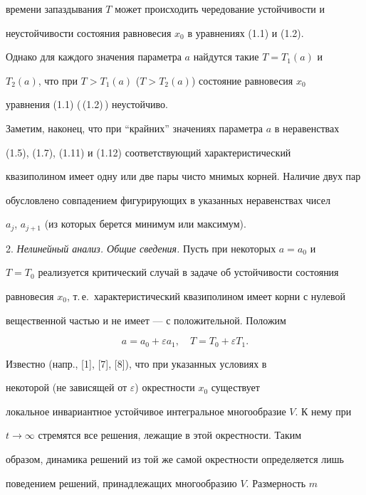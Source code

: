 времени запаздывания $T$ может происходить чередование устойчивости и


неустойчивости состояния равновесия $x_0$ в уравнениях (1.1) и (1.2).


Однако для каждого значения параметра $a$ найдутся такие $T=T_1(a)$ и


$T_2(a)$, что при $T>T_1(a)$ ($T>T_2(a)$) состояние равновесия $x_0$


уравнения (1.1) (\,(1.2)\,) неустойчиво.





Заметим, наконец, что при ``крайних'' значениях параметра $a$ в неравенствах


(1.5), (1.7), (1.11) и (1.12) соответствующий характеристический


квазиполином имеет одну или две пары чисто мнимых корней. Наличие двух пар


обусловлено совпадением фигурирующих в указанных неравенствах чисел


$a_j$, $a_{j+1}$ (из которых берется минимум или максимум).


\medskip





2. {\it Нелинейный анализ. Общие сведения.} Пусть при некоторых $a = a_0$ и


$T=T_0$ реализуется критический случай в задаче об устойчивости состояния


равновесия $x_0$, т.\,е.~характеристический квазиполином имеет корни с нулевой


вещественной частью и не имеет --- с положительной. Положим


$$


a = a_0 + \varepsilon a_1, \quad T = T_0 + \varepsilon T_1.


$$


Известно (напр., [1], [7], [8]), что при указанных условиях в


некоторой (не зависящей от $\varepsilon$) окрестности $x_0$ существует


локальное инвариантное устойчивое интегральное многообразие $V$. К нему при


$t\to\infty$ стремятся все решения, лежащие в этой окрестности. Таким


образом, динамика решений из той же самой окрестности определяется лишь


поведением решений, принадлежащих многообразию $V$. Размерность $m$


